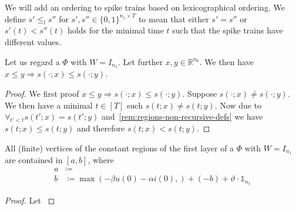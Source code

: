 We will add an ordering to spike trains based on lexicographical ordering. We define \(s'≤_ls''\) for \(s',s''∈\{0,1\}^{n_1×T}\) to mean that either \(s'=s''\) or \(s'(t)<s''(t)\) holds for the minimal time \(t\) such that the spike trains have different values.

\begin{lemma}
  Let us regard a \dtlifsnn \(Φ\) with \(W=I_{n_1}\).
  Let further \(x,y∈ℝ^{n_0}\). We then have \(x≤y⇒s(·;x)≤s(·;y)\).
\end{lemma}

\begin{proof}
  We first proof \(x≤y⇒s(·;x)≤s(·;y)\). Suppose \(s(·;x)≠s(·;y)\). We then have a minimal \(t∈[T]\) such \(s(t;x)≠s(t;y)\). Now due to \(∀_{t'<t}s(t';x)=s(t';y)\) and~\autoref{rem:regions-non-recursive-defs} we have \(s(t;x)≤s(t;y)\) and therefore \(s(t;x)<s(t;y)\).
\end{proof}

\begin{lemma}
  All (finite) vertices of the constant regions of the first layer of a \dtlifsnn \(Φ\) with \(W=I_{n_1}\) are contained in \([a,b]\), where
  \begin{align*}
   a &≔ \\
   b &≔\max(-βu(0)-αi(0),)+(-b)+ϑ·𝟙_{n_1}
  \end{align*}
\end{lemma}

\begin{proof}
  Let \(\)
\end{proof}






